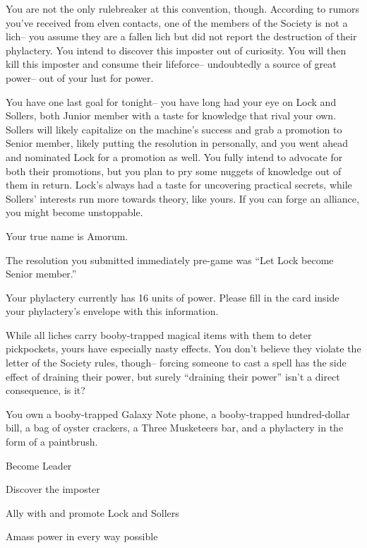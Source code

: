 \documentclass[char]{Sel}
\begin{document}
You are not the only rulebreaker at this convention, though. According to rumors you've received from elven contacts, one of the members of the Society is not a lich-- you assume they are a fallen lich but did not report the destruction of their phylactery. You intend to discover this imposter out of curiosity. You will then kill this imposter and consume their lifeforce-- undoubtedly a source of great power-- out of your lust for power.

You have one last goal for tonight-- you have long had your eye on Lock and Sollers, both Junior member with a taste for knowledge that rival your own. Sollers will likely capitalize on the machine's success and grab a promotion to Senior member, likely putting the resolution in personally, and you went ahead and nominated Lock for a promotion as well. You fully intend to advocate for both their promotions, but you plan to pry some nuggets of knowledge out of them in return. Lock's always had a taste for uncovering practical secrets, while Sollers' interests run more towards theory, like yours. If you can forge an alliance, you might become unstoppable.

\begin{itemz}[Notes]
  \item Your true name is Amorum.
  \item The resolution you submitted immediately pre-game was ``Let Lock become Senior member.''
      \item Your phylactery currently has 16 units of power. Please fill in the card inside your phylactery's envelope with this information.
   \item While all liches carry booby-trapped magical items with them to deter pickpockets, yours have especially nasty effects. You don't believe they violate the letter of the Society rules, though-- forcing someone to cast a spell has the side effect of draining their power, but surely ``draining their power'' isn't a direct consequence, is it?
\item You own a booby-trapped Galaxy Note phone, a booby-trapped hundred-dollar bill, a bag of oyster crackers, a Three Musketeers bar, and a phylactery in the form of a paintbrush.
    \end{itemz}
   
    
 \begin{itemz}[Goals]
\item Become Leader
\item Discover the imposter
\item Ally with and promote Lock and Sollers
\item Amass power in every way possible
\end{itemz}
\end{document}
